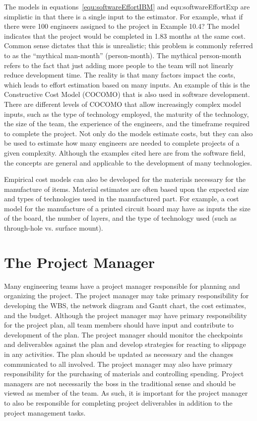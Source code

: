 The models in 
equations~\ref{equ:softwareEffortIBM} and {equ:softwareEffortExp}
 are simplistic in that there is a single input
to the estimator. For example, what if there were 100 engineers assigned
to the project in Example 10.4? The model indicates that the project
would be completed in 1.83 months at the same cost. Common sense
dictates that this is unrealistic; this problem is commonly referred to
as the ``mythical man-month'' (person-month). The mythical person-month
refers to the fact that just adding more people to the team will not
linearly reduce development time. The reality is that many factors
impact the costs, which leads to effort estimation based on many inputs.
An example of this is the Constructive Cost Model (COCOMO) that is also
used in software development. There are different levels of COCOMO that
allow increasingly complex model inputs, such as the type of technology
employed, the maturity of the technology, the size of the team, the
experience of the engineers, and the timeframe required to complete the
project. Not only do the models estimate costs, but they can also be
used to estimate how many engineers are needed to complete projects of a
given complexity. Although the examples cited here are from the software
field, the concepts are general and applicable to the development of
many technologies.

Empirical cost models can also be developed for the materials necessary
for the manufacture of items. Material estimates are often based upon
the expected size and types of technologies used in the manufactured
part. For example, a cost model for the manufacture of a printed circuit
board may have as inputs the size of the board, the number of layers,
and the type of technology used (such as through-hole vs. surface
mount).

\section{The Project Manager}
\label{section:the-project-manager}

Many engineering teams have a project manager responsible for planning
and organizing the project. The project manager may take primary
responsibility for developing the WBS, the network diagram and Gantt
chart, the cost estimates, and the budget. Although the project manager
may have primary responsibility for the project plan, all team members
should have input and contribute to development of the plan. The project
manager should monitor the checkpoints and deliverables against the plan
and develop strategies for reacting to slippage in any activities. The
plan should be updated as necessary and the changes communicated to all
involved. The project manager may also have primary responsibility for
the purchasing of materials and controlling spending. Project managers
are not necessarily the boss in the traditional sense and should be
viewed as member of the team. As such, it is important for the project
manager to also be responsible for completing project deliverables in
addition to the project management tasks.

